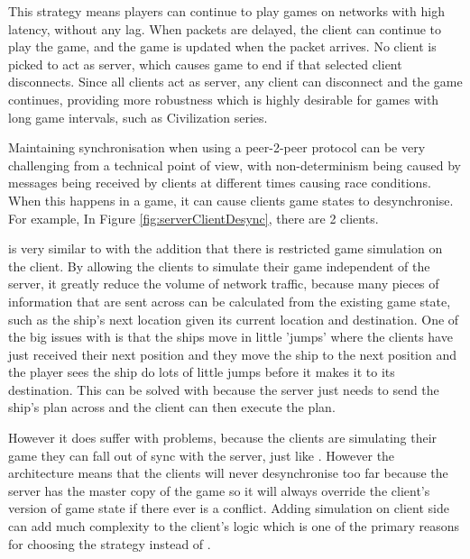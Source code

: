 This strategy means players can continue to play games on networks with high latency, without any lag. When packets are delayed, the client can continue to play the game, and the game is updated when the packet arrives.
No client is picked to act as server, which causes game to end if that selected client disconnects.
Since all clients act as server, any client can disconnect and the game continues, providing more robustness which is highly desirable for games with long game intervals, such as Civilization series\cite{civilizationInMyPants}.



Maintaining synchronisation when using a peer-2-peer protocol can be very challenging from a technical point of view, with non-determinism being caused by messages being received by clients at different times causing race conditions.
When this happens in a game, it can cause clients game states to desynchronise.
For example, In Figure \ref{fig:serverClientDesync}, there are 2 clients.


\emph{\stepThreeName} is very similar to \stepTwoName with the addition that there is restricted game simulation on the client.
By allowing the clients to simulate their game independent of the server, it greatly reduce the volume of network traffic, because many pieces of information that are sent across can be calculated from the existing game state, such as the ship's next location given its current location and destination.
One of the big issues with \stepTwoName is that the ships move in little 'jumps' where the clients have just received their next position and they move the ship to the next position and the player sees the ship do lots of little jumps before it makes it to its destination. This can be solved with \stepThreeName because the server just needs to send the ship's plan across and the client can then execute the plan.

However it does suffer with problems, because the clients are simulating their game they can fall out of sync with the server, just like \stepOneName. However the architecture means that the clients will never desynchronise too far because the server has the master copy of the game so it will always override the client's version of game state if there ever is a conflict. 
Adding simulation on client side can add much complexity to the client's logic which is one of the primary reasons for choosing the \stepTwoName strategy instead of \stepThreeName.


